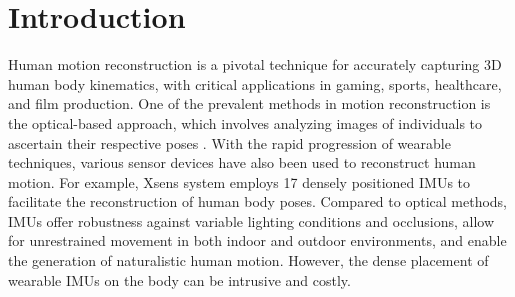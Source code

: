 \documentclass[letterpaper]{article} %
\begin{document}
\section{Introduction}
Human motion reconstruction is a pivotal technique for accurately capturing 3D human body kinematics, with critical applications in gaming, sports, healthcare, and film production.
One of the prevalent methods in motion reconstruction is the optical-based approach, which involves analyzing images of individuals to ascertain their respective poses \cite{chen2020cross,sengupta2023humaniflow,cao2017realtime}. With the rapid progression of wearable techniques, various sensor devices have also been used to reconstruct human motion.
For example, Xsens \cite{schepers2018xsens} system employs 17 densely positioned IMUs to facilitate the reconstruction of human body poses.
Compared to optical methods, IMUs offer robustness against variable lighting conditions and occlusions, allow for unrestrained movement in both indoor and outdoor environments, and enable the generation of naturalistic human motion.
However, the dense placement of wearable IMUs on the body can be intrusive and costly.

\end{document}
